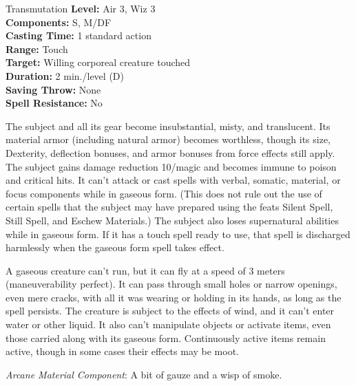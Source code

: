{Transmutation}
{
	\textbf{Level:}
	Air 3, Wiz 3\\
	\textbf{Components:}
	S, M/DF\\
	\textbf{Casting Time:}
	1 standard action\\
	\textbf{Range:}
	Touch\\
	\textbf{Target:}
	Willing corporeal creature touched\\
	\textbf{Duration:}
	2 min./level (D)\\
	\textbf{Saving Throw:}
	None\\
	\textbf{Spell Resistance:}
	No\\
}
{
	The subject and all its gear become insubstantial, misty, and translucent. Its material armor (including natural armor) becomes worthless, though its size, Dexterity, deflection bonuses, and armor bonuses from force effects still apply. The subject gains damage reduction 10/magic and becomes immune to poison and critical hits. It can't attack or cast spells with verbal, somatic, material, or focus components while in gaseous form. (This does not rule out the use of certain spells that the subject may have prepared using the feats Silent Spell, Still Spell, and Eschew Materials.) The subject also loses supernatural abilities while in gaseous form. If it has a touch spell ready to use, that spell is discharged harmlessly when the gaseous form spell takes effect.

	A gaseous creature can't run, but it can fly at a speed of 3 meters (maneuverability perfect). It can pass through small holes or narrow openings, even mere cracks, with all it was wearing or holding in its hands, as long as the spell persists. The creature is subject to the effects of wind, and it can't enter water or other liquid. It also can't manipulate objects or activate items, even those carried along with its gaseous form. Continuously active items remain active, though in some cases their effects may be moot.

	\textit{Arcane Material Component}:
	A bit of gauze and a wisp of smoke.

}
